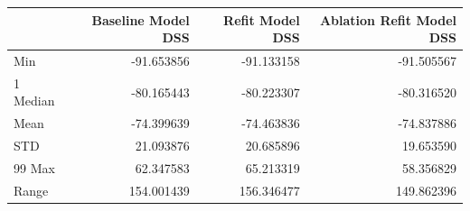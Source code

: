 \begin{tabular}{lrrr}
\toprule
 & Baseline Model DSS & Refit Model DSS & Ablation Refit Model DSS \\
\midrule
Min & -91.653856 & -91.133158 & -91.505567 \\
1%
Median & -80.165443 & -80.223307 & -80.316520 \\
Mean & -74.399639 & -74.463836 & -74.837886 \\
STD & 21.093876 & 20.685896 & 19.653590 \\
99%
Max & 62.347583 & 65.213319 & 58.356829 \\
Range & 154.001439 & 156.346477 & 149.862396 \\
\bottomrule
\end{tabular}
